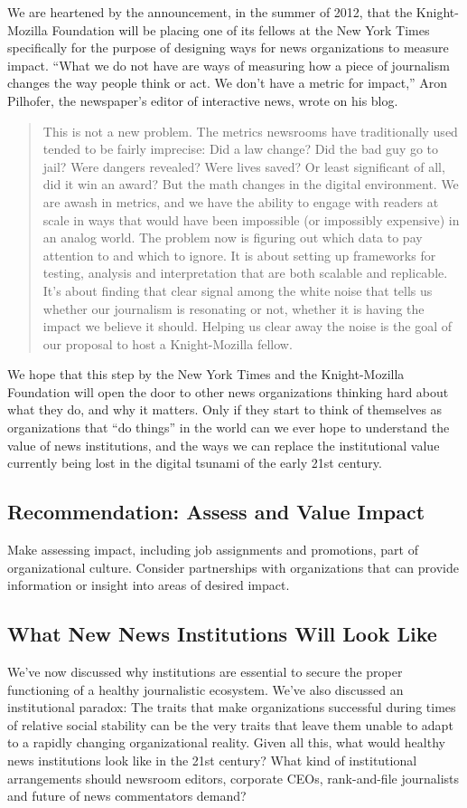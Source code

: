 We are heartened by the announcement, in the summer of 2012, that the Knight-
Mozilla Foundation will be placing one of its fellows at the New York Times
specifically for the purpose of designing ways for news organizations to measure
impact. ``What we do not have are ways of measuring how a piece of journalism
changes the way people think or act. We don’t have a metric for impact,'' Aron
Pilhofer, the newspaper’s editor of interactive news, wrote on his blog.

\begin{quote}
This is not a new problem. The metrics newsrooms have traditionally
used tended to be fairly imprecise: Did a law change? Did the bad guy
go to jail? Were dangers revealed? Were lives saved? Or least significant
of all, did it win an award?
But the math changes in the digital environment. We are awash in
metrics, and we have the ability to engage with readers at scale in
ways that would have been impossible (or impossibly expensive) in an
analog world.
The problem now is figuring out which data to pay attention to and
which to ignore. It is about setting up frameworks for testing, analysis
and interpretation that are both scalable and replicable.
It’s about finding that clear signal among the white noise that tells us
whether our journalism is resonating or not, whether it is having the
impact we believe it should. Helping us clear away the noise is the goal
of our proposal to host a Knight-Mozilla fellow.
\end{quote}

We hope that this step by the New York Times and the Knight-Mozilla Foundation
will open the door to other news organizations thinking hard about what
they do, and why it matters. Only if they start to think of themselves as organizations
that ``do things'' in the world can we ever hope to understand the value of
news institutions, and the ways we can replace the institutional value currently
being lost in the digital tsunami of the early 21st century.

\subsection{Recommendation: Assess and Value Impact}
Make assessing impact, including job assignments and promotions, part
of organizational culture. Consider partnerships with organizations that
can provide information or insight into areas of desired impact.

\subsection{What New News Institutions Will Look Like}
We’ve now discussed why institutions are essential to secure the proper functioning
of a healthy journalistic ecosystem. We’ve also discussed an institutional
paradox: The traits that make organizations successful during times of relative
social stability can be the very traits that leave them unable to adapt to a rapidly
changing organizational reality. Given all this, what would healthy news institutions
look like in the 21st century? What kind of institutional arrangements
should newsroom editors, corporate CEOs, rank-and-file journalists and future
of news commentators demand?

